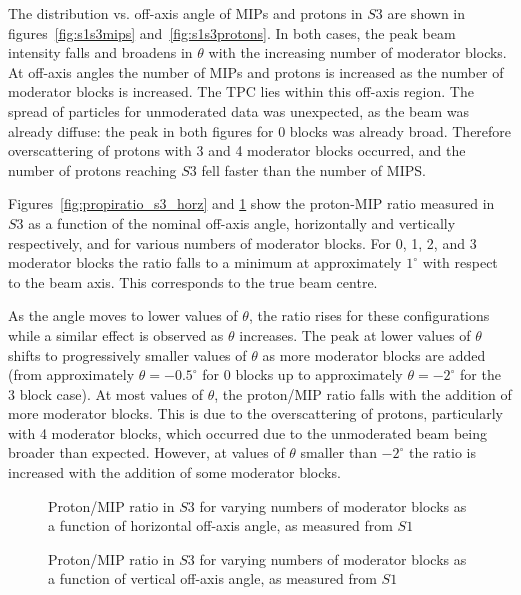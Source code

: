 The distribution vs. off-axis angle of MIPs and protons in $\mathit{S3}$ are shown in figures~\ref{fig:s1s3mips} and~\ref{fig:s1s3protons}.
In both cases, the peak beam intensity falls and broadens in $\theta$ with the increasing number of moderator blocks. 
At off-axis angles the number of MIPs and protons is increased as the number of moderator blocks is increased.
The TPC lies within this off-axis region.
The spread of particles for unmoderated data was unexpected, as the beam was already diffuse: the peak in both figures for 0 blocks was already broad.
Therefore overscattering of protons with 3 and 4 moderator blocks occurred, and the number of protons reaching $\mathit{S3}$ fell faster than the number of MIPS.

Figures~\ref{fig:propiratio_s3_horz} and \ref{fig:propiratio_s3_vert} show the proton-MIP ratio measured in $\mathit{S3}$ as a function of the nominal off-axis angle, horizontally and vertically respectively, and for various numbers of moderator blocks.
For 0, 1, 2, and 3 moderator blocks the ratio falls to a minimum at approximately $1^{\circ}$ with respect to the beam axis.
This corresponds to the true beam centre.

As the angle moves to lower values of $\theta$, the ratio rises for these configurations while a similar effect is observed as $\theta$ increases.
The peak at lower values of $\theta$ shifts to progressively smaller values of $\theta$ as more moderator blocks are added (from approximately $\theta = -0.5^{\circ}$ for 0 blocks up to approximately $\theta = -2^{\circ}$ for the 3 block case).
At most values of $\theta$, the proton/MIP ratio falls with the addition of more moderator blocks. 
This is due to the overscattering of protons, particularly with 4 moderator blocks, which occurred due to the unmoderated beam being broader than expected.
However, at values of $\theta$ smaller than $-2^{\circ}$ the ratio is increased with the addition of some moderator blocks.

\begin{figure}[!ht]
  \begin{minipage}[t]{0.48\textwidth}
    \begin{adjustbox}{max totalsize={\textwidth}{.35\textheight}, center}
      
    \end{adjustbox}
    \caption{Proton/MIP ratio in $\mathit{S3}$ for varying numbers of moderator blocks as a function of horizontal off-axis angle, as measured from $\mathit{S1}$}
    \label{fig:propiratio_s3_horz}
  \end{minipage}
  \hspace{0.3cm}
  \begin{minipage}[t]{0.48\textwidth}
    \begin{adjustbox}{max totalsize={\textwidth}{.35\textheight}, center}
      
    \end{adjustbox}
    \caption{Proton/MIP ratio in $\mathit{S3}$ for varying numbers of moderator blocks as a function of vertical off-axis angle, as measured from $\mathit{S1}$}
    \label{fig:propiratio_s3_vert}
  \end{minipage}	
\end{figure}

